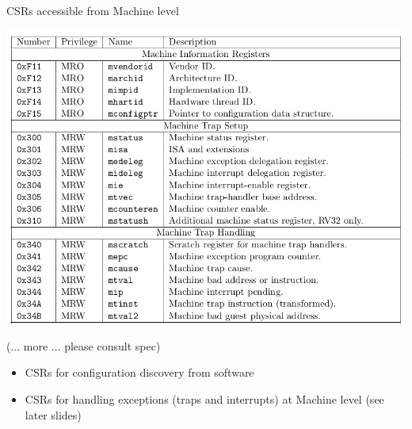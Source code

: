 \documentclass{article}
\begin{document}
\begin{center}
  {\Huge
    CSRs accessible from Machine level}

  \vspace*{0.2in}

  \begin{minipage}{9in}\LARGE
    \begin{center}
      \includegraphics[width=7in]{Figs/CSRs_Machine_Level.png}

      \vspace*{0.1in}

      {\Large (... more ... please consult spec)}
    \end{center}

    \begin{itemize}
    \item CSRs for configuration discovery from software

    \item CSRs for handling exceptions (traps and interrupts) at Machine level (see later slides)
    \end{itemize}
  \end{minipage}

\end{center}

\clearpage

\end{document}
